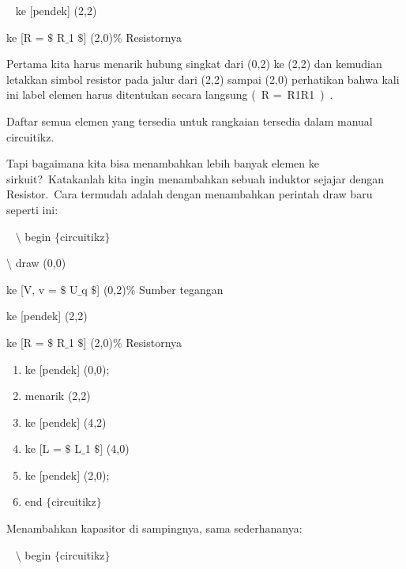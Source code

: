 \noindent 
~ ke [pendek] (2,2)
\par


\noindent 
 ke [R = $\$$ R$ \_ $1 $\$$] (2,0)$\%$ Resistornya 
\par


\noindent 
Pertama kita harus menarik hubung singkat dari (0,2) ke (2,2) dan kemudian letakkan simbol resistor pada jalur dari (2,2) sampai (2,0) perhatikan bahwa kali ini label elemen harus ditentukan secara langsung ( R = R1R1 ) .
\par


\noindent 
Daftar semua elemen yang tersedia untuk rangkaian tersedia dalam manual circuitikz.
\par


\noindent 
Tapi bagaimana kita bisa menambahkan lebih banyak elemen ke sirkuit? Katakanlah kita ingin menambahkan sebuah induktor sejajar dengan Resistor. Cara termudah adalah dengan menambahkan perintah draw baru seperti ini:
\par


\noindent 
~ $\setminus$ begin $ \{ $circuitikz$ \} $
\par


\noindent 
 $\setminus$ draw (0,0)
\par


\noindent 
 ke [V, v = $\$$ U$ \_ $q $\$$] (0,2)$\%$ Sumber tegangan
\par


\noindent 
 ke [pendek] (2,2)
\par


\noindent 
 ke [R = $\$$ R$ \_ $1 $\$$] (2,0)$\%$ Resistornya
\par


\begin{enumerate}
	\item ke [pendek] (0,0);
	\item menarik (2,2)
	\item ke [pendek] (4,2)
	\item ke [L = $\$$ L$ \_ $1 $\$$] (4,0)
	\item ke [pendek] (2,0);
	\item end $ \{ $circuitikz$ \} $
\end{enumerate}



\noindent 
Menambahkan kapasitor di sampingnya, sama sederhananya:
\par


\noindent 
~ $\setminus$ begin $ \{ $circuitikz$ \} $
\par


